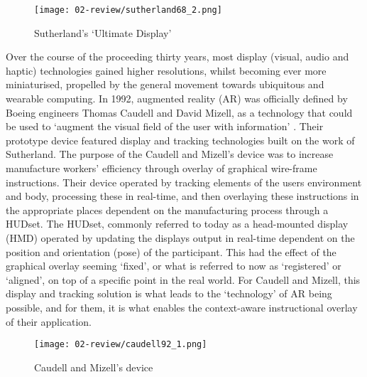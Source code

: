 \begin{figure}[bth]
    \myfloatalign
    {\texttt{[image: 02-review/sutherland68\_2.png]}}
    \caption[Sutherland's `Ultimate Display']{Sutherland's `Ultimate Display'}\label{fig: sutherlandsword}
\end{figure}

Over the course of the proceeding thirty years, most display (visual, audio and haptic) technologies gained higher resolutions, whilst becoming ever more miniaturised, propelled by the general movement towards ubiquitous and wearable computing.  In 1992, augmented reality (AR) was officially defined by Boeing engineers Thomas Caudell and David Mizell, as a technology that could be used to `augment the visual field of the user with information' \citeyearpar{caudell1992}. Their prototype device featured display and tracking technologies built on the work of Sutherland. The purpose of the Caudell and Mizell’s device was to increase manufacture workers' efficiency through overlay of graphical wire-frame instructions. Their device operated by tracking elements of the users environment and body, processing these in real-time, and then overlaying these instructions in the appropriate places dependent on the manufacturing process through a HUDset. The HUDset, commonly referred to today as a head-mounted display (HMD) operated by updating the displays output in real-time dependent on the position and orientation (pose) of the participant. This had the effect of the graphical overlay seeming `fixed', or what is referred to now as `registered' or `aligned', on top of a specific point in the real world. For Caudell and Mizell, this display and tracking solution is what leads to the `technology' of AR being possible, and for them, it is what enables the context-aware instructional overlay of their application.

\begin{figure}[bth]
    \myfloatalign
    {\texttt{[image: 02-review/caudell92\_1.png]}}
    \caption[Caudell and Mizell's device]{Caudell and Mizell's device}\label{fig: caudellprivateeye}
\end{figure}

